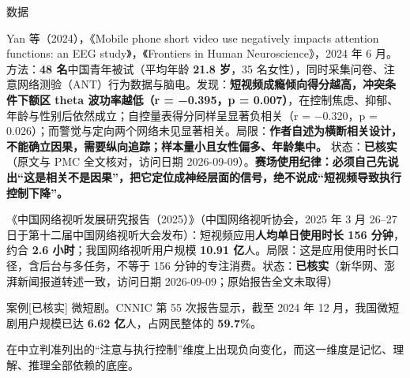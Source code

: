 \documentclass[prep,both]{debate}
\begin{document}
\begin{fields}
\begin{evidence}{数据}
\end{evidence}
\begin{bullets}
\item Yan 等（2024），《Mobile phone short video use negatively impacts attention functions: an EEG study》，《Frontiers in Human Neuroscience》，2024 年 6 月。方法：\textbf{48 名}中国青年被试（平均年龄 \textbf{21.8 岁}，35 名女性），同时采集问卷、注意网络测验（ANT）行为数据与脑电。发现：\textbf{短视频成瘾倾向得分越高，冲突条件下额区 theta 波功率越低（r = −0.395，p = 0.007）}，在控制焦虑、抑郁、年龄与性别后依然成立；自控量表得分同样呈显著负相关（r = −0.320，p = 0.026）；而警觉与定向两个网络未见显著相关。局限：\textbf{作者自述为横断相关设计，不能确立因果，需要纵向追踪；样本量小且女性偏多、年龄集中。} 状态：\textbf{已核实}（原文与 PMC 全文核对，访问日期 2026-09-09）。\textbf{赛场使用纪律：必须自己先说出“这是相关不是因果”，把它定位成神经层面的信号，绝不说成“短视频导致执行控制下降”。}
\item 《中国网络视听发展研究报告（2025）》（中国网络视听协会，2025 年 3 月 26–27 日于第十二届中国网络视听大会发布）：短视频应用\textbf{人均单日使用时长 156 分钟}，约合 \textbf{2.6 小时}；我国网络视听用户规模 \textbf{10.91 亿}人。局限：这是应用使用时长口径，含后台与多任务，不等于 156 分钟的专注消费。状态：\textbf{已核实}（新华网、澎湃新闻报道转述一致，访问日期 2026-09-09；原始报告全文未取得）
\end{bullets}
\begin{evidence}{案例}[已核实]
微短剧。CNNIC 第 55 次报告显示，截至 2024 年 12 月，我国微短剧用户规模已达 \textbf{6.62 亿}人，占网民整体的 \textbf{59.7\%}。
\end{evidence}
\closing[回扣判准]{在中立判准列出的“注意与执行控制”维度上出现负向变化，而这一维度是记忆、理解、推理全部依赖的底座。}
\begin{clash}
\end{clash}
\end{fields}
\end{document}
